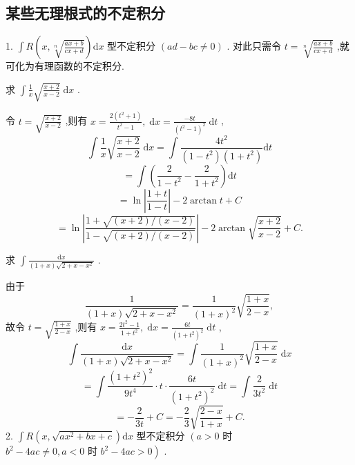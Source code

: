 \subsection{某些无理根式的不定积分}

1. \(\int R\left( {x,\sqrt[n]{\frac{{ax} + b}{{cx} + d}}}\right) \mathrm{d}x\) 型不定积分 \(\left( {{ad} - {bc} \neq  0}\right)\) . 对此只需令 \(t = \sqrt[n]{\frac{{ax} + b}{{cx} + d}}\) ,就可化为有理函数的不定积分.

\begin{example}

\end{example}
求 \(\int \frac{1}{x}\sqrt{\frac{x + 2}{x - 2}}\mathrm{\;d}x\) .

\begin{solution}

\end{solution}
令 \(t = \sqrt{\frac{x + 2}{x - 2}}\) ,则有 \(x = \frac{2\left( {{t}^{2} + 1}\right) }{{t}^{2} - 1},\mathrm{\;d}x = \frac{-{8t}}{{\left( {t}^{2} - 1\right) }^{2}}\mathrm{\;d}t\) ,
\[
\int \frac{1}{x}\sqrt{\frac{x + 2}{x - 2}}\mathrm{\;d}x = \int \frac{4{t}^{2}}{\left( {1 - {t}^{2}}\right) \left( {1 + {t}^{2}}\right) }\mathrm{d}t
\]
\[
= \int \left( {\frac{2}{1 - {t}^{2}} - \frac{2}{1 + {t}^{2}}}\right) \mathrm{d}t
\]
\[
= \ln \left| \frac{1 + t}{1 - t}\right|  - 2\arctan t + C
\]
\[
= \ln \left| \frac{1 + \sqrt{\left( {x + 2}\right) /\left( {x - 2}\right) }}{1 - \sqrt{\left( {x + 2}\right) /\left( {x - 2}\right) }}\right|  - 2\arctan \sqrt{\frac{x + 2}{x - 2}} + C.
\]
\begin{example}

\end{example}
求 \(\int \frac{\mathrm{d}x}{\left( {1 + x}\right) \sqrt{2 + x - {x}^{2}}}\) .

\begin{solution}

\end{solution}
由于
\[
\frac{1}{\left( {1 + x}\right) \sqrt{2 + x - {x}^{2}}} = \frac{1}{{\left( 1 + x\right) }^{2}}\sqrt{\frac{1 + x}{2 - x}},
\]
故令 \(t = \sqrt{\frac{1 + x}{2 - x}}\) ,则有 \(x = \frac{2{t}^{2} - 1}{1 + {t}^{2}},\mathrm{\;d}x = \frac{6t}{{\left( 1 + {t}^{2}\right) }^{2}}\mathrm{\;d}t\) ,
\[
\int \frac{\mathrm{d}x}{\left( {1 + x}\right) \sqrt{2 + x - {x}^{2}}} = \int \frac{1}{{\left( 1 + x\right) }^{2}}\sqrt{\frac{1 + x}{2 - x}}\mathrm{\;d}x
\]
\[
= \int \frac{{\left( 1 + {t}^{2}\right) }^{2}}{9{t}^{4}} \cdot  t \cdot  \frac{6t}{{\left( 1 + {t}^{2}\right) }^{2}}\mathrm{\;d}t = \int \frac{2}{3{t}^{2}}\mathrm{\;d}t
\]
\[
=  - \frac{2}{3t} + C =  - \frac{2}{3}\sqrt{\frac{2 - x}{1 + x}} + C.
\]
2. \(\int R\left( {x,\sqrt{a{x}^{2} + {bx} + c}}\right) \mathrm{d}x\) 型不定积分 \(\left( {a > 0}\right.\) 时 \(\left. {{b}^{2} - {4ac} \neq  0,a < 0\text{ 时 }{b}^{2} - {4ac} > 0}\right)\) .

